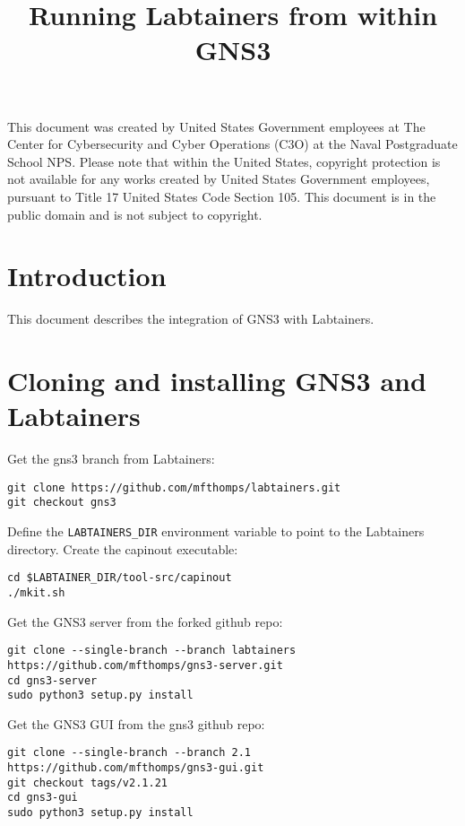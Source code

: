 \documentclass[12pt]{article}
\begin{document}
\begin{titlepage}
\title {Running Labtainers from within GNS3}
\maketitle

\vspace{2.0in}
This document was created by United States Government employees at 
The Center for Cybersecurity and Cyber Operations (C3O) at the Naval Postgraduate School NPS. 
Please note that within the United States, copyright protection is not available for any works created  
by United States Government employees, pursuant to Title 17 United States Code Section 105.   
This document is in the public domain and is not subject to copyright. 
\end{titlepage}
\tableofcontents
\newpage
\section {Introduction}
This document describes the integration of GNS3 with Labtainers.


\section{Cloning and installing GNS3 and Labtainers}
Get the gns3 branch from Labtainers:
\begin{verbatim}
git clone https://github.com/mfthomps/labtainers.git
git checkout gns3 
\end{verbatim}
\noindent Define the {\tt LABTAINERS\_DIR} environment variable to point to the Labtainers directory.
Create the capinout executable:
\begin{verbatim}
cd $LABTAINER_DIR/tool-src/capinout
./mkit.sh
\end{verbatim}

Get the GNS3 server from the forked github repo:
\begin{verbatim}
git clone --single-branch --branch labtainers https://github.com/mfthomps/gns3-server.git
cd gns3-server
sudo python3 setup.py install
\end{verbatim}

Get the GNS3 GUI from the gns3 github repo:
\begin{verbatim}
git clone --single-branch --branch 2.1 https://github.com/mfthomps/gns3-gui.git
git checkout tags/v2.1.21
cd gns3-gui
sudo python3 setup.py install
\end{verbatim}
\end{document}
